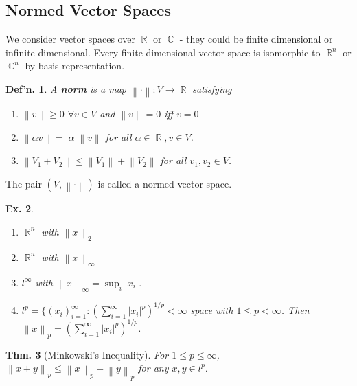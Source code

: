 \documentclass[12pt, a4paper]{book}
\DeclareMathOperator{\R}{\mathbb{R}}
\DeclareMathOperator{\C}{\mathbb{C}}
\newcommand{\norm}[1]{\left\lVert#1\right\rVert} %
\newtheorem{theorem}{Thm.}[section]
\newtheorem{definition}[theorem]{Def'n.}
\newtheorem{example}[theorem]{Ex.}
\theoremstyle{nonumberplain}
\begin{document}
\subsection{Normed Vector Spaces}
We consider vector spaces over $\R$ or $\C$ - they could be finite dimensional or infinite dimensional. Every finite dimensional
vector space is isomorphic to $\R^n$ or $\C^n$ by basis representation.
\begin{definition}
    A \textbf{norm} is a map $\norm{\cdot}:V\to\R$ satisfying
    \begin{enumerate}
        \item $\norm{v}\geq 0$ $\forall v\in V$ and $\norm{v}=0$ iff $v=0$
        \item $\norm{\alpha v}=|\alpha|\norm{v}$ for all $\alpha\in\R, v\in V$.
        \item $\norm{V_1+V_2}\leq\norm{V_1}+\norm{V_2}$ for all $v_1,v_2\in V$.
    \end{enumerate}
\end{definition}
The pair $(V,\norm{\cdot})$ is called a normed vector space.
\begin{example}
    \begin{enumerate}
        \item $\R^n$ with $\norm{x}_2$
        \item $\R^n$ with $\norm{x}_\infty$
        \item $l^\infty$ with $\norm{x}_\infty=\sup_i|x_i|$.
        \item $l^p=\{(x_i)_{i=1}^\infty:\left( \sum\limits_{i=1}^\infty |x_i|^p \right)^{1/p}<\infty$ space with $1\leq p<\infty$.
            Then $\norm{x}_p=\left(\sum\limits_{i=1}^\infty |x_i|^p\right)^{1/p}$.
    \end{enumerate}
\end{example}
\begin{theorem}[Minkowski's Inequality]
    For $1\leq p\leq\infty$, $\norm{x+y}_p\leq\norm{x}_p+\norm{y}_p$ for any $x,y\in l^p$.
\end{theorem}
\end{document}
